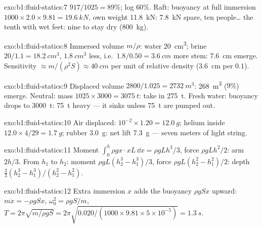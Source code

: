 \begin{solution}{exo:b1:fluid-statics:7}
$917/1025 = 89\%$; log $60\%$. Raft: buoyancy at full immersion $1000 \times
2.0 \times 9.81 = \qty{19.6}{kN}$, own weight \qty{11.8}{kN}: \qty{7.8}{kN}
spare, ten people\dots{} the tenth with wet feet: nine to stay dry
(\qty{800}{kg}).
\end{solution}

\begin{solution}{exo:b1:fluid-statics:8}
Immersed volume $m/\rho$: water \qty{20}{cm^3}; brine $20/1.1 = \qty{18.2}{cm^3}$,
$\qty{1.8}{cm^3}$ less, i.e.\ $1.8/0.50 = \qty{3.6}{cm}$ more stem: \qty{7.6}{cm}
emerge. Sensitivity $\approx m/(\rho^2S) \approx \qty{40}{cm}$ per unit of relative
density (\qty{3.6}{cm} per $0.1$).
\end{solution}

\begin{solution}{exo:b1:fluid-statics:9}
Displaced volume $2800/1.025 = \qty{2732}{m^3}$: \qty{268}{m^3} ($9\%$)
emerge. Neutral: mass $1025 \times 3000 = \qty{3075}{t}$: take in \qty{275}{t}.
Fresh water: buoyancy drops to \qty{3000}{t}: \qty{75}{t} heavy --- it sinks
unless \qty{75}{t} are pumped out.
\end{solution}

\begin{solution}{exo:b1:fluid-statics:10}
Air displaced: $10^{-2} \times 1.20 = \qty{12.0}{g}$; helium inside $12.0 \times
4/29 = \qty{1.7}{g}$; rubber \qty{3.0}{g}: net lift \qty{7.3}{g} --- seven meters
of light string.
\end{solution}

\begin{solution}{exo:b1:fluid-statics:11}
Moment $\int_0^h\rho gx\cdot xL\,\dd x = \rho gLh^3/3$, force $\rho gLh^2/2$:
arm $2h/3$. From $h_1$ to $h_2$: moment $\rho gL(h_2^3 - h_1^3)/3$, force
$\rho gL(h_2^2 - h_1^2)/2$: depth $\frac23(h_2^3 - h_1^3)/(h_2^2 - h_1^2)$.
\end{solution}

\begin{solution}{exo:b1:fluid-statics:12}
Extra immersion $x$ adds the buoyancy $\rho gSx$ upward: $m\ddot x = -\rho gSx$,
$\omega_0^2 = \rho gS/m$, $T = 2\pi\sqrt{m/\rho gS} = 2\pi\sqrt{0.020/(1000 \times
9.81 \times 5\times10^{-5})} = \qty{1.3}{s}$.
\end{solution}

